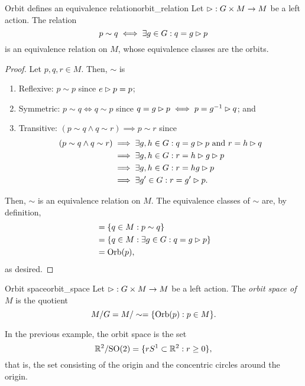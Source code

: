 \begin{proposition}{Orbit defines an equivalence relation}{orbit_relation}
    Let \(\mathbin{\vartriangleright} : G \times M \to M\) be a left action. The relation
    \begin{equation*}
        p \sim q \iff \exists g \in G : q = g \mathbin{\vartriangleright} p
    \end{equation*}
    is an equivalence relation on \(M\), whose equivalence classes are the orbits.
\end{proposition}
\begin{proof}
    Let \(p, q, r \in M\). Then, \(\sim\) is
    \begin{enumerate}[label=(\alph*)]
        \item Reflexive: \(p \sim p\) since \(e \mathbin{\vartriangleright} p = p\);
        \item Symmetric: \(p \sim q \iff q \sim p\) since \(q = g\mathbin{\vartriangleright} p \iff p = g^{-1} \mathbin{\vartriangleright} q\); and
        \item Transitive: \((p\sim q \land q \sim r) \implies p \sim r\) since
            \begin{align*}
                (p \sim q \land q \sim r) &\implies \exists g,h \in G: q = g\mathbin{\vartriangleright} p\text{ and }r = h \mathbin{\vartriangleright} q\\
                                          &\implies \exists g,h \in G : r = h\mathbin{\vartriangleright} g\mathbin{\vartriangleright} p\\
                                          &\implies \exists g,h \in G : r = hg \mathbin{\vartriangleright} p\\
                                          &\implies \exists g' \in G : r = g' \mathbin{\vartriangleright} p.
            \end{align*}
    \end{enumerate}
    Then, \(\sim\) is an equivalence relation on \(M\). The equivalence classes of \(\sim\) are, by definition,
    \begin{align*}
        [p] &= \set{ q \in M : p \sim q}\\
            &= \set {q \in M : \exists g \in G : q = g \lact p}\\
            &= \Orb(p),
    \end{align*}
    as desired.
\end{proof}

\begin{definition}{Orbit space}{orbit_space}
    Let \(\mathbin{\vartriangleright} : G \times M \to M\) be a left action. The \emph{orbit space of \(M\)} is the quotient
    \begin{equation*}
        M/G = M/\sim = \{\operatorname{Orb}(p) : p \in M\}.
    \end{equation*}
\end{definition}
\begin{example}
    In the previous example, the orbit space is the set
    \begin{equation*}
        \mathbb{R}^2 / \mathrm{SO}(2) = \{rS^1 \subset \mathbb{R}^2 : r \geq 0\},
    \end{equation*}
    that is, the set consisting of the origin and the concentric circles around the origin.
\end{example}

